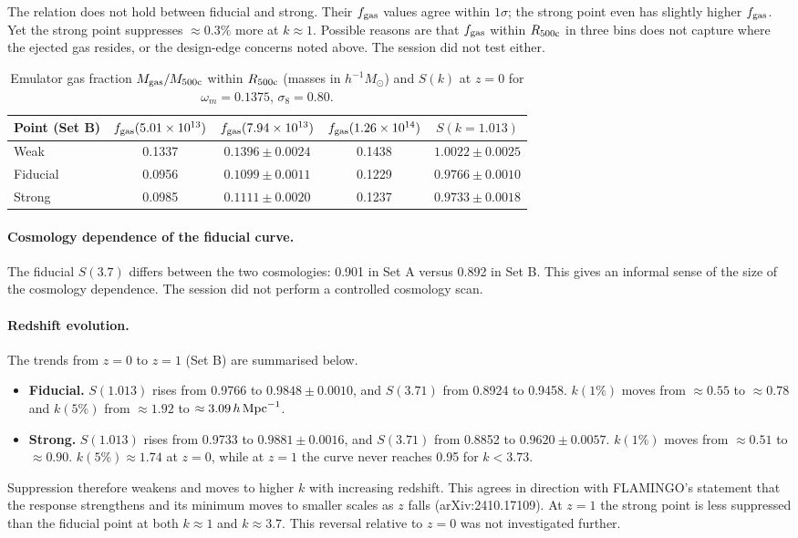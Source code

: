 \documentclass[11pt,a4paper]{article}
\begin{document}
The relation does not hold between fiducial and strong. Their $f_{\rm gas}$ values agree within $1\sigma$; the strong point even has slightly higher $f_{\rm gas}$. Yet the strong point suppresses $\approx0.3\%$ more at $k\approx1$. Possible reasons are that $f_{\rm gas}$ within $R_{\rm 500c}$ in three bins does not capture where the ejected gas resides, or the design-edge concerns noted above. The session did not test either.

\begin{table}
\centering
\begin{tabular}{lcccc}
\toprule
Point (Set B) & $f_{\rm gas}(5.01\times10^{13})$ & $f_{\rm gas}(7.94\times10^{13})$ & $f_{\rm gas}(1.26\times10^{14})$ & $S(k=1.013)$ \\
\midrule
Weak & 0.1337 & $0.1396\pm0.0024$ & 0.1438 & $1.0022\pm0.0025$ \\
Fiducial & 0.0956 & $0.1099\pm0.0011$ & 0.1229 & $0.9766\pm0.0010$ \\
Strong & 0.0985 & $0.1111\pm0.0020$ & 0.1237 & $0.9733\pm0.0018$ \\
\bottomrule
\end{tabular}
\caption{Emulator gas fraction $M_{\rm gas}/M_{\rm 500c}$ within $R_{\rm 500c}$ (masses in $h^{-1}M_\odot$) and $S(k)$ at $z=0$ for $\omega_m=0.1375$, $\sigma_8=0.80$.}
\label{tab:fgas}
\end{table}

\paragraph{Cosmology dependence of the fiducial curve.} The fiducial $S(3.7)$ differs between the two cosmologies: 0.901 in Set A versus 0.892 in Set B. This gives an informal sense of the size of the cosmology dependence. The session did not perform a controlled cosmology scan.

\paragraph{Redshift evolution.} The trends from $z=0$ to $z=1$ (Set B) are summarised below.
\begin{itemize}
\item \textbf{Fiducial.} $S(1.013)$ rises from 0.9766 to $0.9848\pm0.0010$, and $S(3.71)$ from 0.8924 to 0.9458. $k(1\%)$ moves from $\approx0.55$ to $\approx0.78$ and $k(5\%)$ from $\approx1.92$ to $\approx3.09\,h\,{\rm Mpc}^{-1}$.
\item \textbf{Strong.} $S(1.013)$ rises from 0.9733 to $0.9881\pm0.0016$, and $S(3.71)$ from 0.8852 to $0.9620\pm0.0057$. $k(1\%)$ moves from $\approx0.51$ to $\approx0.90$. $k(5\%)\approx1.74$ at $z=0$, while at $z=1$ the curve never reaches 0.95 for $k<3.73$.
\end{itemize}
Suppression therefore weakens and moves to higher $k$ with increasing redshift. This agrees in direction with FLAMINGO's statement that the response strengthens and its minimum moves to smaller scales as $z$ falls (arXiv:2410.17109). At $z=1$ the strong point is less suppressed than the fiducial point at both $k\approx1$ and $k\approx3.7$. This reversal relative to $z=0$ was not investigated further.
\end{document}
